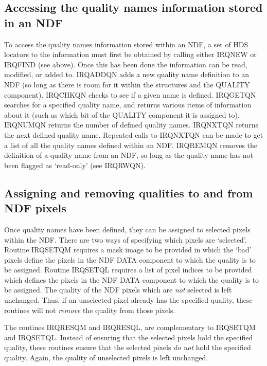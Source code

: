 \documentclass[twoside,11pt]{article}
\newcommand{\htmlref}[2]{#1}
\newcommand{\latex}[1]{#1}
\renewcommand{\_}{\texttt{\symbol{95}}}
\begin{document}
\subsection{Accessing the quality names information stored in an NDF}

To access the quality names information stored within an NDF, a set of
HDS locators to the information must first be obtained by calling either
\htmlref{IRQ\_NEW}{IRQ_NEW} or \htmlref{IRQ\_FIND}{IRQ_FIND}\latex{ (see
above)}. Once this has been done the information can be read, modified,
or added to. \htmlref{IRQ\_ADDQN}{IRQ_ADDQN} adds a new quality name
definition to an NDF (so long as there is room for it within the
structures and the QUALITY component). \htmlref{IRQ\_CHKQN}{IRQ_CHKQN}
checks to see if a given name is defined. \htmlref{IRQ\_GETQN}{IRQ_GETQN}
searches for a specified quality name, and returns various items of
information about it (such as which bit of the QUALITY component it is
assigned to). \htmlref{IRQ\_NUMQN}{IRQ_NUMQN} returns the number of
defined quality names. \htmlref{IRQ\_NXTQN}{IRQ_NXTQN} returns the next
defined quality name. Repeated calls to IRQ\_NXTQN can be made to get a
list of all the quality names defined within an NDF.
\htmlref{IRQ\_REMQN}{IRQ_REMQN} removes the definition of a quality name
from an NDF, so long as the quality name has not been flagged as
`read-only' (see \htmlref{IRQ\_RWQN}{IRQ_RWQN}).

\subsection{Assigning and removing qualities to and from NDF pixels}

Once quality names have been defined, they can be assigned to selected
pixels within the NDF. There are two ways of specifying which pixels are
`selected'. Routine \htmlref{IRQ\_SETQM}{IRQ_SETQM} requires a mask image
to be provided in which the `bad' pixels define the pixels in the NDF
DATA component to which the quality is to be assigned. Routine 
\htmlref{IRQ\_SETQL}{IRQ_SETQL} requires a list of pixel indices to be
provided which defines the pixels in the NDF DATA component to which the
quality is to be assigned. The quality of the NDF pixels which are {\em
not} selected is left unchanged. Thus, if an unselected pixel already has
the specified quality, these routines will not {\em remove} the quality
from those pixels. 

The routines \htmlref{IRQ\_RESQM}{IRQ_RESQM} and
\htmlref{IRQ\_RESQL}{IRQ_RESQL}, are complementary to
\htmlref{IRQ\_SETQM}{IRQ_SETQM} and \htmlref{IRQ\_SETQL}{IRQ_SETQL}.
Instead of ensuring that the selected pixels hold the specified quality,
these routines ensure that the selected pixels {\em do not} hold the
specified quality. Again, the quality of unselected pixels is left
unchanged.
\end{document}
